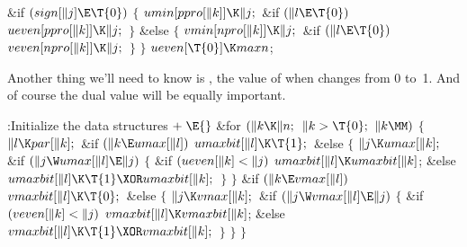 \&{if} ${}(\\{sign}[\|j]\E\T{0}){}$\5
${}\{{}$\1\6
${}\\{umin}[\\{ppro}[\|k]]\K\|j;{}$\6
\&{if} ${}(\|l\E\T{0}){}$\1\5
${}\\{ueven}[\\{ppro}[\|k]]\K\|j;{}$\2\6
\4${}\}{}$\5
\2\&{else}\5
${}\{{}$\1\6
${}\\{vmin}[\\{npro}[\|k]]\K\|j;{}$\6
\&{if} ${}(\|l\E\T{0}){}$\1\5
${}\\{veven}[\\{npro}[\|k]]\K\|j;{}$\2\6
\4${}\}{}$\2\6
\4${}\}{}$\2\6
${}\\{ueven}[\T{0}]\K\\{maxn}{}$;\par
\fi

Another thing we'll need to know is , the value of
 when  changes from 0 to~1. And of
course
the dual value  will be equally important.

\Y\B\4:Initialize the data structures\X${}\mathrel+\E{}$\6
\&{for} ${}(\|k\K\|n;{}$ ${}\|k>\T{0};{}$ ${}\|k\MM){}$\5
${}\{{}$\1\6
${}\|l\K\\{par}[\|k];{}$\6
\&{if} ${}(\|k\E\\{umax}[\|l]){}$\1\5
${}\\{umaxbit}[\|l]\K\T{1};{}$\2\6
\&{else}\5
${}\{{}$\1\6
${}\|j\K\\{umax}[\|k];{}$\6
\&{if} ${}(\|j\W\\{umax}[\|l]\E\|j){}$\5
${}\{{}$\1\6
\&{if} ${}(\\{ueven}[\|k]<\|j){}$\1\5
${}\\{umaxbit}[\|l]\K\\{umaxbit}[\|k]{}$;\2\6
\&{else}\1\5
${}\\{umaxbit}[\|l]\K\T{1}\XOR\\{umaxbit}[\|k];{}$\2\6
\4${}\}{}$\2\6
\4${}\}{}$\2\6
\&{if} ${}(\|k\E\\{vmax}[\|l]){}$\1\5
${}\\{vmaxbit}[\|l]\K\T{0};{}$\2\6
\&{else}\5
${}\{{}$\1\6
${}\|j\K\\{vmax}[\|k];{}$\6
\&{if} ${}(\|j\W\\{vmax}[\|l]\E\|j){}$\5
${}\{{}$\1\6
\&{if} ${}(\\{veven}[\|k]<\|j){}$\1\5
${}\\{vmaxbit}[\|l]\K\\{vmaxbit}[\|k]{}$;\2\6
\&{else}\1\5
${}\\{vmaxbit}[\|l]\K\T{1}\XOR\\{vmaxbit}[\|k];{}$\2\6
\4${}\}{}$\2\6
\4${}\}{}$\2\6
\4${}\}{}$\2\par
\fi

